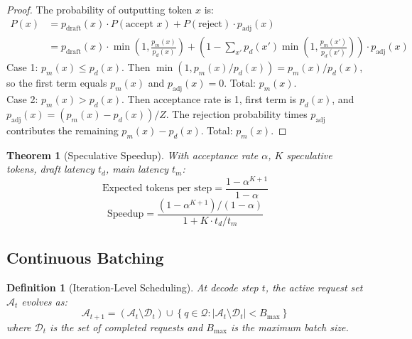 \documentclass[12pt,a4paper]{article}
\newtheorem{definition}{Definition}[section]
\newtheorem{theorem}{Theorem}[section]
\begin{document}
\begin{proof}
The probability of outputting token $x$ is:
\begin{align}
P(x) &= p_{\text{draft}}(x) \cdot P(\text{accept } x) + P(\text{reject}) \cdot p_{\text{adj}}(x) \\
&= p_{\text{draft}}(x) \cdot \min\left(1, \frac{p_m(x)}{p_d(x)}\right) + \left(1 - \sum_{x'} p_d(x') \min\left(1, \frac{p_m(x')}{p_d(x')}\right)\right) \cdot p_{\text{adj}}(x)
\end{align}
Case 1: $p_m(x) \leq p_d(x)$. Then $\min(1, p_m(x)/p_d(x)) = p_m(x)/p_d(x)$, so the first term equals $p_m(x)$ and $p_{\text{adj}}(x) = 0$. Total: $p_m(x)$. \\
Case 2: $p_m(x) > p_d(x)$. Then acceptance rate is 1, first term is $p_d(x)$, and $p_{\text{adj}}(x) = (p_m(x) - p_d(x))/Z$. The rejection probability times $p_{\text{adj}}$ contributes the remaining $p_m(x) - p_d(x)$. Total: $p_m(x)$. \qedhere
\end{proof}

\begin{theorem}[Speculative Speedup]
With acceptance rate $\alpha$, $K$ speculative tokens, draft latency $t_d$, main latency $t_m$:
\begin{equation}
\text{Expected tokens per step} = \frac{1 - \alpha^{K+1}}{1 - \alpha}
\label{eq:spec_tokens}
\end{equation}
\begin{equation}
\text{Speedup} = \frac{(1 - \alpha^{K+1})/(1 - \alpha)}{1 + K \cdot t_d/t_m}
\label{eq:spec_speedup}
\end{equation}
\end{theorem}

\subsection{Continuous Batching}

\begin{definition}[Iteration-Level Scheduling]
At decode step $t$, the active request set $\mathcal{A}_t$ evolves as:
\begin{equation}
\mathcal{A}_{t+1} = \left(\mathcal{A}_t \setminus \mathcal{D}_t\right) \cup \left\{q \in \mathcal{Q} : |\mathcal{A}_t \setminus \mathcal{D}_t| < B_{\max}\right\}
\label{eq:batch_schedule}
\end{equation}
where $\mathcal{D}_t$ is the set of completed requests and $B_{\max}$ is the maximum batch size.
\end{definition}
\end{document}
